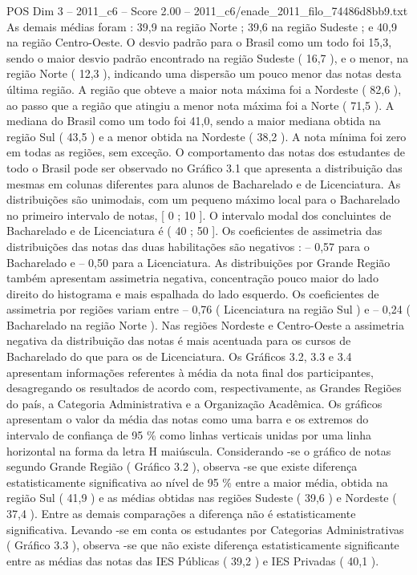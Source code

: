 \begin{textsample}{POS Dim 3 – 2011\_c6 – Score 2.00 – 2011\_c6/enade\_2011\_filo\_74486d8bb9.txt}
As demais médias foram : 39,9 na região Norte ; 39,6 na região Sudeste ; e 40,9 na região Centro-Oeste.
O desvio padrão para o Brasil como um todo foi 15,3, sendo o maior desvio padrão encontrado na região Sudeste ( 16,7 ), e o menor, na região Norte ( 12,3 ), indicando uma dispersão um pouco menor das notas desta última região.
A região que obteve a maior nota máxima foi a Nordeste ( 82,6 ), ao passo que a região que atingiu a menor nota máxima foi a Norte ( 71,5 ).
A mediana do Brasil como um todo foi 41,0, sendo a maior mediana obtida na região Sul ( 43,5 ) e a menor obtida na Nordeste ( 38,2 ).
A nota mínima foi zero em todas as regiões, sem exceção.
O comportamento das notas dos estudantes de todo o Brasil pode ser observado no Gráfico 3.1 que apresenta a distribuição das mesmas em colunas diferentes para alunos de Bacharelado e de Licenciatura.
As distribuições são unimodais, com um pequeno máximo local para o Bacharelado no primeiro intervalo de notas, [ 0 ; 10 ].
O intervalo modal dos concluintes de Bacharelado e de Licenciatura é ( 40 ; 50 ].
Os coeficientes de assimetria das distribuições das notas das duas habilitações são negativos : – 0,57 para o Bacharelado e – 0,50 para a Licenciatura.
As distribuições por Grande Região também apresentam assimetria negativa, concentração pouco maior do lado direito do histograma e mais espalhada do lado esquerdo.
Os coeficientes de assimetria por regiões variam entre – 0,76 ( Licenciatura na região Sul ) e – 0,24 ( Bacharelado na região Norte ).
Nas regiões Nordeste e Centro-Oeste a assimetria negativa da distribuição das notas é mais acentuada para os cursos de Bacharelado do que para os de Licenciatura.
Os Gráficos 3.2, 3.3 e 3.4 apresentam informações referentes à média da nota final dos participantes, desagregando os resultados de acordo com, respectivamente, as Grandes Regiões do país, a Categoria Administrativa e a Organização Acadêmica.
Os gráficos apresentam o valor da média das notas como uma barra e os extremos do intervalo de confiança de 95 \% como linhas verticais unidas por uma linha horizontal na forma da letra H maiúscula.
Considerando -se o gráfico de notas segundo Grande Região ( Gráfico 3.2 ), observa -se que existe diferença estatisticamente significativa ao nível de 95 \% entre a maior média, obtida na região Sul ( 41,9 ) e as médias obtidas nas regiões Sudeste ( 39,6 ) e Nordeste ( 37,4 ).
Entre as demais comparações a diferença não é estatisticamente significativa.
Levando -se em conta os estudantes por Categorias Administrativas ( Gráfico 3.3 ), observa -se que não existe diferença estatisticamente significante entre as médias das notas das IES Públicas ( 39,2 ) e IES Privadas ( 40,1 ).

\end{textsample}
